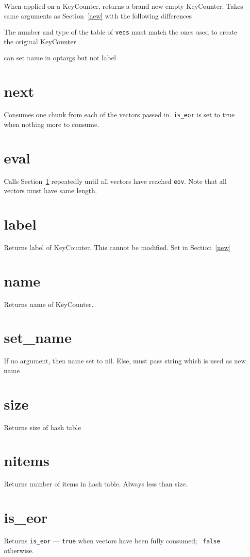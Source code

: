 When applied on a KeyCounter, returns a brand new empty KeyCounter.
Takes same arguments as Section~\ref{new} with the following differences
\be
\item The number and type of the table of {\tt vecs} must match the ones used to
create the original KeyCounter
\item can set name in optargs but not label
\ee

\section{next}
\label{next}
Consumes one chunk from each of the vectors passed in.
{\tt is\_eor} is set to true when nothing more to consume.

\section{eval}
\label{eval}
Calls Section~\ref{next} repeatedly until all vectors have reached {\tt eov}.
Note that all vectors must have same length.

\section{label}
\label{label}
Returns label of KeyCounter. This cannot be modified. 
Set in Section~\ref{new}

\section{name}
\label{name}
Returns name of KeyCounter. 

\section{set\_name}
\label{set_name}
If no argument, then name set to nil.
Else, must pass string which is used as new name

\section{size}
\label{size}
Returns size of hash table

\section{nitems}
\label{nitems}
Returns number of items in hash table. Always less than size.

\section{is\_eor}
\label{is_eor}
Returns {\tt is\_eor} --- {\tt true} when vectors have been fully consumed; {\tt
false} otherwise.

